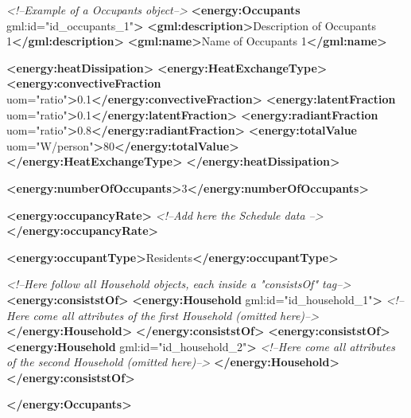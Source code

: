 \documentclass[a4paper,12pt]{article}
\newenvironment{Shaded}{}{}
\newcommand{\KeywordTok}[1]{\textcolor[rgb]{0.00,0.44,0.13}{\textbf{{#1}}}}
\newcommand{\StringTok}[1]{\textcolor[rgb]{0.25,0.44,0.63}{{#1}}}
\newcommand{\CommentTok}[1]{\textcolor[rgb]{0.38,0.63,0.69}{\textit{{#1}}}}
\newcommand{\OtherTok}[1]{\textcolor[rgb]{0.00,0.44,0.13}{{#1}}}
\newcommand{\NormalTok}[1]{{#1}}
\begin{document}
\begin{Shaded}
\begin{Highlighting}[]
\CommentTok{<!--Example of a Occupants object-->}
\KeywordTok{<energy:Occupants}\OtherTok{ gml:id=}\StringTok{"id_occupants_1"}\KeywordTok{>}
    \KeywordTok{<gml:description>}\NormalTok{Description of Occupants 1}\KeywordTok{</gml:description>}
    \KeywordTok{<gml:name>}\NormalTok{Name of Occupants 1}\KeywordTok{</gml:name>}

    \KeywordTok{<energy:heatDissipation>}
        \KeywordTok{<energy:HeatExchangeType>}
            \KeywordTok{<energy:convectiveFraction}\OtherTok{ uom=}\StringTok{"ratio"}\KeywordTok{>}\NormalTok{0.1}\KeywordTok{</energy:convectiveFraction>}
            \KeywordTok{<energy:latentFraction}\OtherTok{ uom=}\StringTok{"ratio"}\KeywordTok{>}\NormalTok{0.1}\KeywordTok{</energy:latentFraction>}
            \KeywordTok{<energy:radiantFraction}\OtherTok{ uom=}\StringTok{"ratio"}\KeywordTok{>}\NormalTok{0.8}\KeywordTok{</energy:radiantFraction>}
            \KeywordTok{<energy:totalValue}\OtherTok{ uom=}\StringTok{"W/person"}\KeywordTok{>}\NormalTok{80}\KeywordTok{</energy:totalValue>}
        \KeywordTok{</energy:HeatExchangeType>}
    \KeywordTok{</energy:heatDissipation>}

    \KeywordTok{<energy:numberOfOccupants>}\NormalTok{3}\KeywordTok{</energy:numberOfOccupants>}

    \KeywordTok{<energy:occupancyRate>}
        \CommentTok{<!--Add here the Schedule data -->}
    \KeywordTok{</energy:occupancyRate>}

    \KeywordTok{<energy:occupantType>}\NormalTok{Residents}\KeywordTok{</energy:occupantType>}

    \CommentTok{<!--Here follow all Household objects, each inside a "consistsOf" tag-->}
    \KeywordTok{<energy:consiststOf>}
        \KeywordTok{<energy:Household}\OtherTok{ gml:id=}\StringTok{"id_household_1"}\KeywordTok{>}
            \CommentTok{<!--Here come all attributes of the first Household (omitted here)-->}
        \KeywordTok{</energy:Household>}
    \KeywordTok{</energy:consiststOf>}
    \KeywordTok{<energy:consiststOf>}
        \KeywordTok{<energy:Household}\OtherTok{ gml:id=}\StringTok{"id_household_2"}\KeywordTok{>}
            \CommentTok{<!--Here come all attributes of the second Household (omitted here)-->}
        \KeywordTok{</energy:Household>}
    \KeywordTok{</energy:consiststOf>}

\KeywordTok{</energy:Occupants>}
\end{Highlighting}
\end{Shaded}
\end{document}
